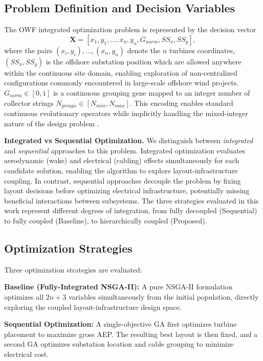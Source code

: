 \documentclass[format=sigconf,anonymous=true,review=true]{acmart}
\begin{document}
\subsection{Problem Definition and Decision Variables}

The OWF integrated optimization problem is represented by the decision vector
\begin{equation}
\mathbf{X} = [x_1, y_1, \dots, x_n, y_n, G_{norm}, SS_x, SS_y],
\end{equation}
where the pairs $(x_i, y_i),\ldots,(x_n,y_n)$ denote the $n$ turbines coordinates, $(SS_x, SS_y)$ is the offshore substation position which are allowed anywhere within the continuous site domain, enabling exploration of non-centralized configurations commonly encountered in large-scale offshore wind projects. $G_{norm} \in [0,1]$ is a continuous grouping gene mapped to an integer number of collector strings $N_{groups} \in [N_{min}, N_{max}]$. 
This encoding enables standard continuous evolutionary operators while implicitly handling the mixed-integer nature of the design problem \cite{Haupt2004}.

\textbf{Integrated vs Sequential Optimization.} 
We distinguish between \textit{integrated} and \textit{sequential} approaches to this problem. Integrated optimization evaluates aerodynamic (wake) and electrical (cabling) effects simultaneously for each candidate solution, enabling the algorithm to explore layout-infrastructure coupling. In contrast, sequential approaches decouple the problem by fixing layout decisions before optimizing electrical infrastructure, potentially missing beneficial interactions between subsystems. The three strategies evaluated in this work represent different degrees of integration, from fully decoupled (Sequential) to fully coupled (Baseline), to hierarchically coupled (Proposed).

\subsection{Optimization Strategies}

Three optimization strategies are evaluated:

\textbf{Baseline (Fully-Integrated NSGA-II):}  
A pure NSGA-II formulation~\cite{Deb2002NSGA2} optimizes all $2n+3$ variables simultaneously from the initial population, directly exploring the coupled layout-infrastructure design space.

\textbf{Sequential Optimization:}  
A single-objective GA first optimizes turbine placement to maximize gross AEP. The resulting best layout is then fixed, and a second GA optimizes substation location and cable grouping to minimize electrical cost.
\end{document}

